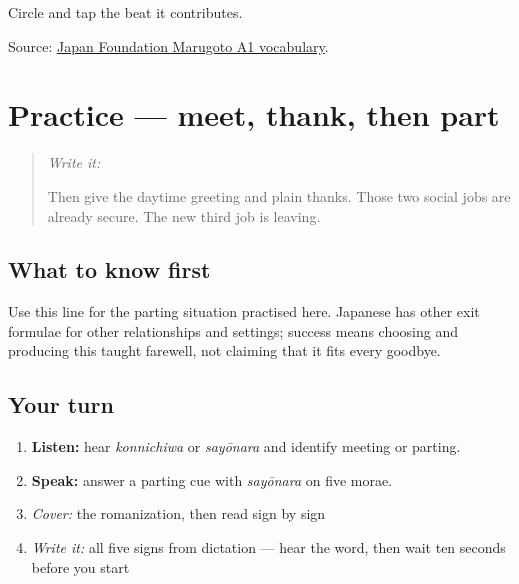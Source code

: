 \begin{tcolorbox}[breakable,colback=teal!4,colframe=teal!35!black,title={Before you move on}]
Circle \textbf{} and tap the beat it contributes.

Source: \href{https://words.marugotoweb.jp/search\_detail.php?cd=1\&id=435\&lang=en\&lv=A1\&source=cando}{Japan Foundation Marugoto A1 vocabulary}.
\end{tcolorbox}
\section[Practice]{Practice — meet, thank, then part}

\label{lesson:JA-C08-sayounara}



\begin{quote}
\emph{Write it:} \textbf{}

Then give the daytime greeting and plain thanks. Those two social jobs are already secure. The new third job is leaving.
\end{quote}

\subsection*{What to know first}
\begin{quote}
\textbf{}
\end{quote}

Use this line for the parting situation practised here. Japanese has other exit formulae for other relationships and settings; success means choosing and producing this taught farewell, not claiming that it fits every goodbye.

\subsection*{Your turn}
\begin{enumerate}
\raggedright
  \item \textbf{Listen:} hear \emph{konnichiwa} or \emph{sayōnara} and identify meeting or parting.
  \item \textbf{Speak:} answer a parting cue with \emph{sayōnara} on five morae.
  \item \emph{Cover:} the romanization, then read \textbf{} sign by sign
  \item \emph{Write it:} all five signs from dictation — hear the word, then wait ten seconds before you start
\end{enumerate}

